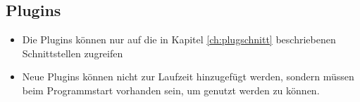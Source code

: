 \subsection{Plugins}
  \begin{itemize}
    \item Die Plugins können nur auf die in Kapitel \ref{ch:plugschnitt} beschriebenen Schnittstellen zugreifen
    \item Neue Plugins können nicht zur Laufzeit hinzugefügt werden, sondern müssen beim Programmstart vorhanden sein, um genutzt werden zu können.
  \end{itemize}
